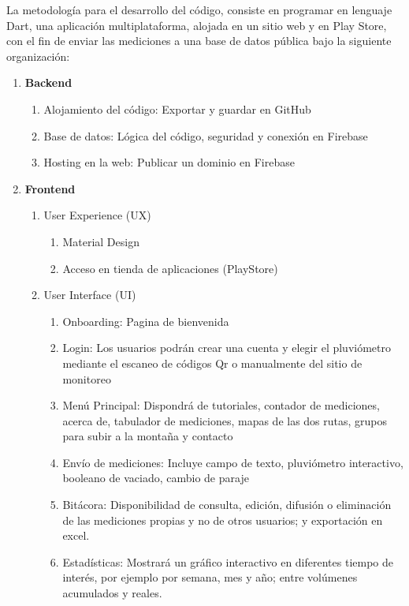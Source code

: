 La metodología para el desarrollo del código, consiste en programar en lenguaje Dart, una aplicación multiplataforma, alojada en un sitio web y en Play Store, con el fin de enviar las mediciones a una base de datos pública bajo la siguiente organización:


\begin{enumerate}
  \item \textbf{Backend}
  \begin{enumerate}
    \item Alojamiento del código: Exportar y guardar en GitHub
    \item Base de datos: Lógica del código, seguridad y conexión en Firebase
    \item Hosting en la web: Publicar un dominio en Firebase
  \end{enumerate}
  \item \textbf{Frontend}
  \begin{enumerate}
    \item User Experience (UX)
     \begin{enumerate}
      \item Material Design
      \item Acceso en tienda de aplicaciones (PlayStore)
     \end{enumerate}
    \item User Interface (UI)
    \begin{enumerate}
    \item Onboarding: Pagina de bienvenida 
    \item Login: Los usuarios podrán crear una cuenta y elegir el pluviómetro mediante el escaneo de códigos Qr o manualmente del sitio de monitoreo 
    \item Menú Principal: Dispondrá de tutoriales, contador de mediciones, acerca de, tabulador de mediciones, mapas de las dos rutas, grupos para subir a la montaña y contacto
    \item Envío de mediciones: Incluye campo de texto, pluviómetro interactivo, booleano de vaciado, cambio de paraje
    \item Bitácora: Disponibilidad de consulta, edición, difusión o eliminación de las mediciones propias y no de otros usuarios; y exportación en excel.
    \item Estadísticas: Mostrará un gráfico interactivo en diferentes tiempo de interés, por ejemplo por semana, mes y año; entre volúmenes acumulados y reales.
\end{enumerate}
  \end{enumerate}
\end{enumerate}
